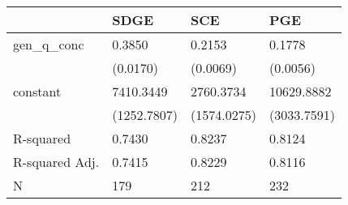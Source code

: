 \begin{tabular}{llll}
\hline
               & SDGE        & SCE         & PGE          \\
\hline
gen\_q\_conc   & 0.3850      & 0.2153      & 0.1778       \\
               & (0.0170)    & (0.0069)    & (0.0056)     \\
constant       & 7410.3449   & 2760.3734   & 10629.8882   \\
               & (1252.7807) & (1574.0275) & (3033.7591)  \\
R-squared      & 0.7430      & 0.8237      & 0.8124       \\
R-squared Adj. & 0.7415      & 0.8229      & 0.8116       \\
N              & 179         & 212         & 232          \\
\hline
\end{tabular}